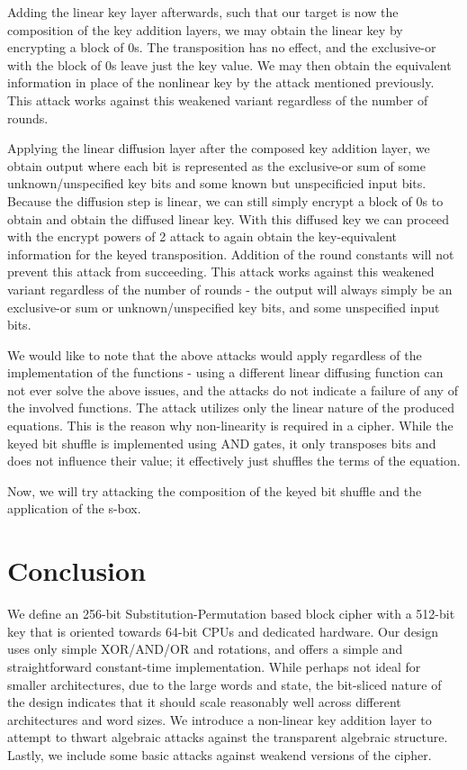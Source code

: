 \documentclass[preprint]{iacrtrans}
\begin{document}
Adding the linear key layer afterwards, such that our target is now the composition of the key addition layers, we may obtain the linear key by encrypting a block of 0s. The transposition has no effect, and the exclusive-or with the block of 0s leave just the key value. We may then obtain the equivalent information in place of the nonlinear key by the attack mentioned previously. This attack works against this weakened variant regardless of the number of rounds.

Applying the linear diffusion layer after the composed key addition layer, we obtain output where each bit is represented as the exclusive-or sum of some unknown/unspecified key bits and some known but unspecificied input bits. Because the diffusion step is linear, we can still simply encrypt a block of 0s to obtain and obtain the diffused linear key. With this diffused key we can proceed with the encrypt powers of 2 attack to again obtain the key-equivalent information for the keyed transposition. Addition of the round constants will not prevent this attack from succeeding. This attack works against this weakened variant regardless of the number of rounds - the output will always simply be an exclusive-or sum or unknown/unspecified key bits, and some unspecified input bits. 

We would like to note that the above attacks would apply regardless of the implementation of the functions - using a different linear diffusing function can not ever solve the above issues, and the attacks do not indicate a failure of any of the involved functions. The attack utilizes only the linear nature of the produced equations. This is the reason why non-linearity is required in a cipher. While the keyed bit shuffle is implemented using AND gates, it only transposes bits and does not influence their value; it effectively just shuffles the terms of the equation.

Now, we will try attacking the composition of the keyed bit shuffle and the application of the s-box. 







\section{Conclusion}
 We define an 256-bit Substitution-Permutation based block cipher with a 512-bit key that is oriented towards 64-bit CPUs and dedicated hardware. Our design uses only simple XOR/AND/OR and rotations, and offers a simple and straightforward constant-time implementation. While perhaps not ideal for smaller architectures, due to the large words and state, the bit-sliced nature of the design indicates that it should scale reasonably well across different architectures and word sizes. We introduce a non-linear key addition layer to attempt to thwart algebraic attacks against the transparent algebraic structure. Lastly, we include some basic attacks against weakend versions of the cipher.
\end{document}
